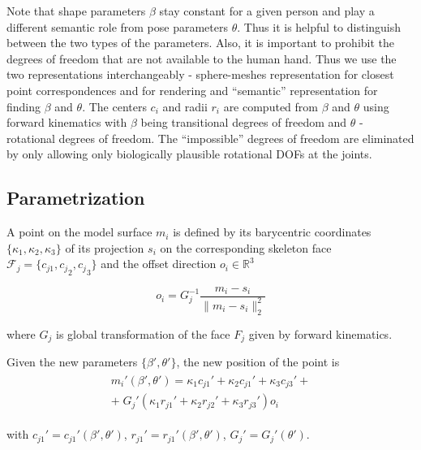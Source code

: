 Note that shape parameters $\beta$ stay constant for a given person and play a different semantic role from pose parameters $\theta$. Thus it is helpful to distinguish between the two types of the parameters. Also, it is important to prohibit the degrees of freedom that are not available to the human hand. Thus we use the two representations interchangeably - sphere-meshes representation for closest point correspondences and for rendering and ``semantic'' representation for finding $\beta$ and $\theta$.
The centers $c_i$ and radii $r_i$ are computed from $\beta$ and $\theta$ using forward kinematics with $\beta$ being transitional degrees of freedom and $\theta$ - rotational degrees of freedom. The ``impossible'' degrees of freedom are eliminated by only allowing only biologically plausible rotational DOFs at the joints.

\subsection {Parametrization}

A point on the model surface $m_i$ is defined by its barycentric coordinates $\{\kappa_1, \kappa_2, \kappa_3\} $ of its projection $s_i$ on the corresponding skeleton face $\mathcal{F}_j = \{c_{j1}, {c_j}_2, {c_j}_3\}$ and the offset direction $o_i \in \mathbb{R}^3$

\begin{equation}
o_i = G_j^{-1} \frac{m_i - s_i} {\| m_i - s_i \|_2^2}
\end{equation}

where $G_j$ is global transformation of the face $F_j$ given by forward kinematics.

Given the new parameters $\{ \beta', \theta' \}$, the new position of the point is
\begin{align}
\begin{split}
m_i'(\beta', \theta') = \kappa_1 c_{j1}' + \kappa_2 c_{j1}' + \kappa_3 c_{j3}' + \\
 + \;  G_j'(\kappa_1 r_{j1}' + \kappa_2 r_{j2}' + \kappa_3 r_{j3}') o_i
\end{split}
\end{align}

with $c_{j1}' = c_{j1}'(\beta', \theta')$,  $r_{j1}' = r_{j1}'(\beta', \theta')$, $G_j' =G_j'(\theta')$.

